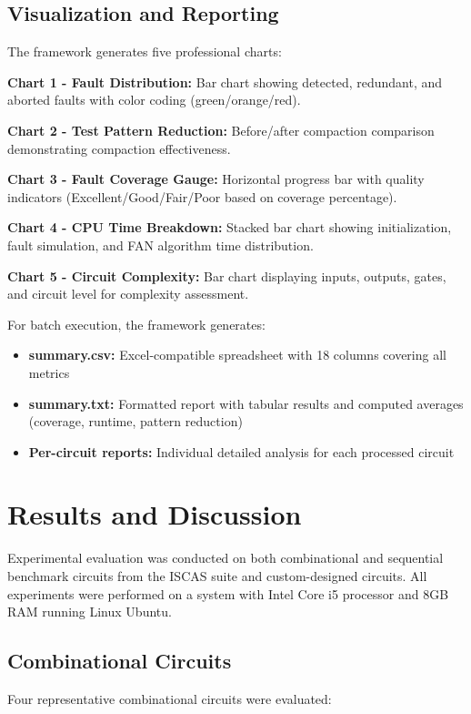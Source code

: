 \documentclass[conference]{IEEEtran}
\begin{document}
\subsection{Visualization and Reporting}

The framework generates five professional charts:

\textbf{Chart 1 - Fault Distribution:} Bar chart showing detected, redundant, and aborted faults with color coding (green/orange/red).

\textbf{Chart 2 - Test Pattern Reduction:} Before/after compaction comparison demonstrating compaction effectiveness.

\textbf{Chart 3 - Fault Coverage Gauge:} Horizontal progress bar with quality indicators (Excellent/Good/Fair/Poor based on coverage percentage).

\textbf{Chart 4 - CPU Time Breakdown:} Stacked bar chart showing initialization, fault simulation, and FAN algorithm time distribution.

\textbf{Chart 5 - Circuit Complexity:} Bar chart displaying inputs, outputs, gates, and circuit level for complexity assessment.

For batch execution, the framework generates:
\begin{itemize}
\item \textbf{summary.csv:} Excel-compatible spreadsheet with 18 columns covering all metrics
\item \textbf{summary.txt:} Formatted report with tabular results and computed averages (coverage, runtime, pattern reduction)
\item \textbf{Per-circuit reports:} Individual detailed analysis for each processed circuit
\end{itemize}

\section{Results and Discussion}

Experimental evaluation was conducted on both combinational and sequential benchmark circuits from the ISCAS suite and custom-designed circuits. All experiments were performed on a system with Intel Core i5 processor and 8GB RAM running Linux Ubuntu.

\subsection{Combinational Circuits}

Four representative combinational circuits were evaluated:
\end{document}
